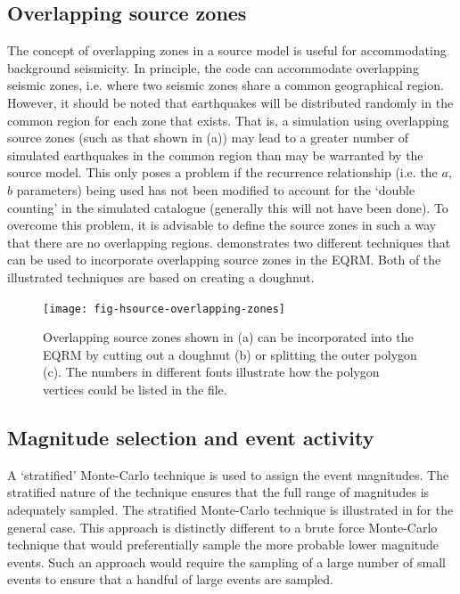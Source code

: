 \subsection{Overlapping source zones}

The concept of overlapping zones in a source model is useful for
accommodating background seismicity. In principle, the code can
accommodate overlapping seismic zones, i.e. where two seismic
zones share a common geographical region. However, it should be
noted that earthquakes will be distributed randomly in the common
region for each zone that exists. That is, a simulation using
overlapping source zones (such as that shown in
(a)) may lead to a greater number
of simulated earthquakes in the common
region than may be warranted by the source model. This only poses
a problem if the recurrence relationship (i.e. the $a$, $b$
parameters) being used has not been modified to account for the
`double counting' in the simulated catalogue (generally this will
not have been done). To overcome this problem, it is advisable to
define the source zones in such a way that there are no
overlapping regions.  demonstrates
two different techniques that can be used to incorporate
overlapping source zones in the EQRM. Both of the illustrated
techniques are based on creating a doughnut.

\begin{figure}[htp]
\texttt{[image: fig-hsource-overlapping-zones]}
\caption{Overlapping source zones shown in (a) can be incorporated
into the EQRM by cutting out a doughnut (b) or splitting the outer
polygon (c). The numbers in different fonts illustrate how the
polygon vertices could be listed in the
 file.
} \label{fig:h-source-overlapping}
\end{figure}



\subsection{Magnitude selection and event activity}
\label{sec:magnitude_selection}

A `stratified' Monte-Carlo technique is used to assign the event
magnitudes. The stratified nature of the technique ensures that
the full range of magnitudes is adequately sampled. The stratified
Monte-Carlo technique is illustrated in
 for the general case. This approach is
distinctly different to a brute force Monte-Carlo technique that
would preferentially sample the more probable lower magnitude
events. Such an approach would require the sampling of a large
number of small events to ensure that a handful of large events
are sampled.

